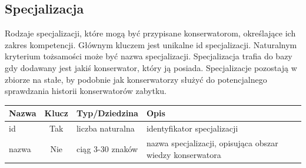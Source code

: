 \documentclass{article}
\begin{document}
\subsection*{Specjalizacja}
Rodzaje specjalizacji, które mogą być przypisane konserwatorom, określające ich zakres kompetencji. Głównym kluczem jest unikalne id specjalizacji. Naturalnym kryterium tożsamości może być nazwa specjalizacji. Specjalizacja trafia do bazy gdy dodawany jest jakiś konserwator, który ją posiada. Specjalizacje pozostają w zbiorze na stałe, by podobnie jak konserwatorzy służyć do potencjalnego sprawdzania historii konserwatorów zabytku.  
\begin{longtable}{|C{3cm}|c|C{4.5cm}|C{5cm}|}
\hline
\textbf{Nazwa} & \textbf{Klucz} & \textbf{Typ/Dziedzina} & \textbf{Opis} \\ \hline
id & Tak & liczba naturalna & identyfikator specjalizacji \\ \hline
nazwa & Nie & ciąg 3-30 znaków & nazwa specjalizacji, opisująca obszar wiedzy konserwatora \\ \hline
\end{longtable}
\end{document}
